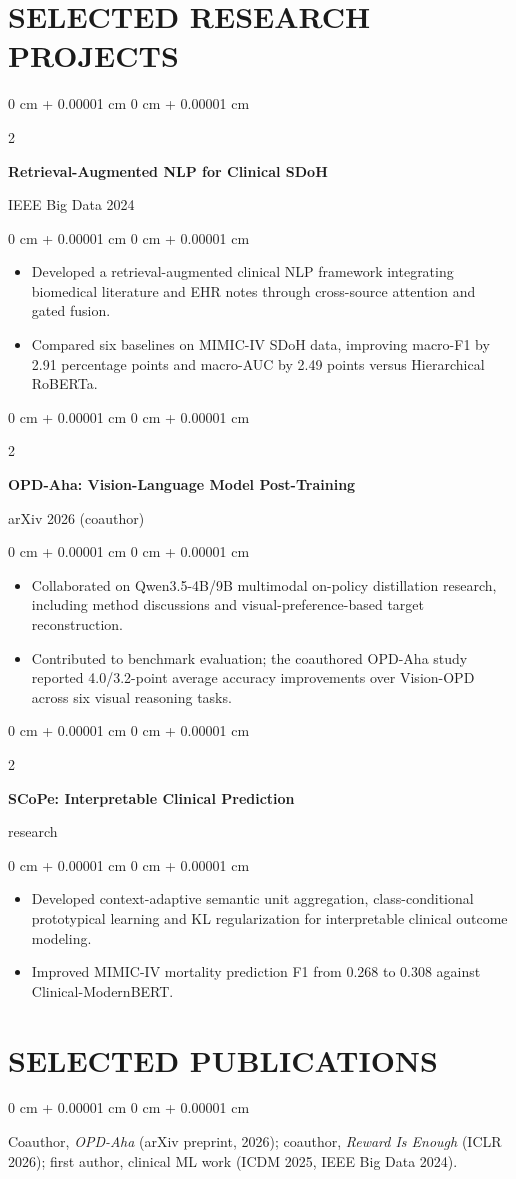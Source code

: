 \documentclass[10pt, letterpaper]{article}
\newenvironment{highlights}{
    \begin{itemize}[
        topsep=0.03 cm,
        parsep=0.03 cm,
        partopsep=0pt,
        itemsep=0pt,
        leftmargin=0 cm + 10pt
    ]
}{
    \end{itemize}
} %
\newenvironment{onecolentry}{
    \begin{adjustwidth}{
        0 cm + 0.00001 cm
    }{
        0 cm + 0.00001 cm
    }
}{
    \end{adjustwidth}
} %
\newenvironment{twocolentry}[2][]{
    \onecolentry
    \def\secondColumn{#2}
    \setcolumnwidth{\fill, 4.5 cm}
    \begin{paracol}{2}
}{
    \switchcolumn \raggedleft \secondColumn
    \end{paracol}
    \endonecolentry
} %
\begin{document}
\section{SELECTED RESEARCH PROJECTS}
\begin{twocolentry}{IEEE Big Data 2024}
\textbf{Retrieval-Augmented NLP for Clinical SDoH}
\end{twocolentry}
\begin{onecolentry}
\begin{highlights}
\item Developed a retrieval-augmented clinical NLP framework integrating biomedical literature and EHR notes through cross-source attention and gated fusion.
\item Compared six baselines on MIMIC-IV SDoH data, improving macro-F1 by 2.91 percentage points and macro-AUC by 2.49 points versus Hierarchical RoBERTa.
\end{highlights}
\end{onecolentry}
\vspace{0.03 cm}
\begin{twocolentry}{arXiv 2026 (coauthor)}
\textbf{OPD-Aha: Vision-Language Model Post-Training}
\end{twocolentry}
\begin{onecolentry}
\begin{highlights}
\item Collaborated on Qwen3.5-4B/9B multimodal on-policy distillation research, including method discussions and visual-preference-based target reconstruction.
\item Contributed to benchmark evaluation; the coauthored OPD-Aha study reported 4.0/3.2-point average accuracy improvements over Vision-OPD across six visual reasoning tasks.
\end{highlights}
\end{onecolentry}
\vspace{0.03 cm}
\begin{twocolentry}{2026 research}
\textbf{SCoPe: Interpretable Clinical Prediction}
\end{twocolentry}
\begin{onecolentry}
\begin{highlights}
\item Developed context-adaptive semantic unit aggregation, class-conditional prototypical learning and KL regularization for interpretable clinical outcome modeling.
\item Improved MIMIC-IV mortality prediction F1 from 0.268 to 0.308 against Clinical-ModernBERT.
\end{highlights}
\end{onecolentry}
\vspace{0.03 cm}
\section{SELECTED PUBLICATIONS}
\begin{onecolentry}
Coauthor, \textit{OPD-Aha} (arXiv preprint, 2026); coauthor, \textit{Reward Is Enough} (ICLR 2026); first author, clinical ML work (ICDM 2025, IEEE Big Data 2024).
\end{onecolentry}
\end{document}

